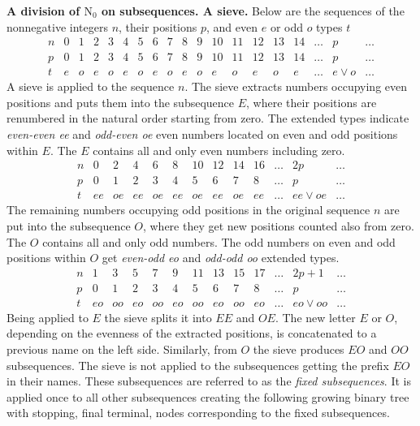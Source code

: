 \documentclass{article}
\begin{document}
\textbf{A division of $\mathrm{N}_0$ on subsequences. A sieve.} Below are the sequences of the nonnegative integers $n$, their positions $p$, and even $e$ or odd $o$ types $t$ 
\begin{displaymath}
\begin{array}{rrrrrrrrrrrrrrrrrrr}
n & 0 & 1 & 2 & 3 & 4 & 5 & 6 & 7 & 8 & 9 & 10 & 11 & 12 & 13 & 14 & \ldots & p & \ldots\\
p & 0 & 1 & 2 & 3 & 4 & 5 & 6 & 7 & 8 & 9 & 10 & 11 & 12 & 13 & 14 & \ldots & p & \ldots\\
t & e & o & e & o & e & o & e & o & e & o & e & o & e & o & e & \ldots & e \vee o & \ldots
\end{array}
\end{displaymath}
A sieve is applied to the sequence $n$. The sieve extracts numbers occupying even positions and puts them into the subsequence $E$, where their positions are renumbered in the natural order starting from zero. The extended types indicate \textit{even-even ee} and \textit{odd-even oe} even numbers located on even and odd positions within $E$. The $E$ contains all and only even numbers including zero.
\begin{displaymath}
\begin{array}{rrrrrrrrrrrrr}
n & 0 & 2 & 4 & 6 & 8 & 10 & 12 & 14 & 16 & \ldots & 2p & \ldots \\
p & 0 & 1 & 2 & 3 & 4 &   5 &   6 &   7 &   8 & \ldots &   p & \ldots \\
t & ee & oe & ee & oe & ee & oe &  ee &   oe &  ee & \ldots &  ee \vee oe & \ldots
\end{array}
\end{displaymath}
The remaining numbers occupying odd positions in the original sequence $n$ are put into the subsequence $O$, where they get new positions counted also from zero. The $O$ contains all and only odd numbers. The odd numbers on even and odd positions within $O$ get \textit{even-odd eo} and \textit{odd-odd oo} extended types.
\begin{displaymath}
\begin{array}{rrrrrrrrrrrrr}
n & 1 & 3 & 5 & 7 & 9 & 11 & 13 & 15 & 17 & \ldots & 2p + 1 &\ldots \\
p & 0 & 1 & 2 & 3 & 4 &   5 &   6 &   7 &   8 & \ldots & p & \ldots \\
t &  eo & oo &  eo & oo & eo & oo & eo & oo & eo & \ldots & eo \vee oo & \ldots
\end{array}
\end{displaymath}
Being applied to $E$ the sieve splits it into $EE$ and $OE$. The new letter $E$ or $O$, depending on the evenness of the extracted positions, is concatenated to a previous name on the left side. Similarly, from $O$ the sieve produces $EO$ and $OO$ subsequences. The sieve is not applied to the subsequences getting the prefix $EO$ in their names. These subsequences are referred to as the \textit{fixed subsequences}. It is applied once to all other subsequences creating the following growing binary tree with stopping, final terminal, nodes corresponding to the fixed subsequences.
\end{document}
